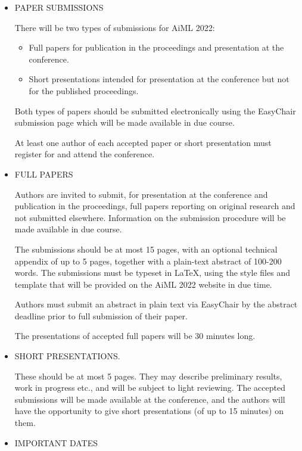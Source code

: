 \documentclass[prodmode,acmtecs]{acmsmall} %
\begin{document}
\begin{itemize}
\item  PAPER SUBMISSIONS  
 
  There will be two types of submissions for AiML 2022:  
 
\begin{itemize}\item   Full papers for publication in the proceedings and presentation at the conference. 
\item  Short presentations intended for presentation at the conference but not for the published proceedings. 
\end{itemize} 
  Both types of papers should be submitted electronically using the EasyChair submission page which will be made available in due course.  
 
  At least one author of each accepted paper or short presentation must register for and attend the conference.  
 
\item  FULL PAPERS   
 
  Authors are invited to submit, for presentation at the conference and publication in the proceedings, full papers reporting on original research and not submitted elsewhere. Information on the submission procedure will be made available in due course.   
 
  The submissions should be at most 15 pages, with an optional technical appendix of up to 5 pages, together with a plain-text abstract of 100-200 words. The submissions must be typeset in LaTeX, using the style files and template that will be provided on the AiML 2022 website in due time.  
 
  Authors must submit an abstract in plain text via EasyChair by the abstract deadline prior to full submission of their paper.  
 
  The presentations of accepted full papers will be 30 minutes long.  
 
\item  SHORT PRESENTATIONS.  
 
  These should be at most 5 pages. They may describe preliminary results, work in progress etc., and will be subject to light reviewing. The accepted submissions will be made available at the conference, and the authors will have the opportunity to give short presentations (of up to 15 minutes) on them.  
 
\item  IMPORTANT DATES  
 

\end{itemize}
\end{document}

